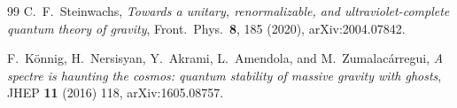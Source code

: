 \documentclass[11pt]{article}
\theoremstyle{definition}
\theoremstyle{remark}
\begin{document}
\begin{thebibliography}{99}
C.~F.~Steinwachs,
\emph{Towards a unitary, renormalizable, and ultraviolet-complete
quantum theory of gravity},
Front.\ Phys.\ \textbf{8}, 185 (2020), arXiv:2004.07842.

F.~K\"onnig, H.~Nersisyan, Y.~Akrami, L.~Amendola, and
M.~Zumalac\'arregui,
\emph{A spectre is haunting the cosmos: quantum stability of massive
gravity with ghosts},
JHEP \textbf{11} (2016) 118, arXiv:1605.08757.

\end{thebibliography}
\end{document}
